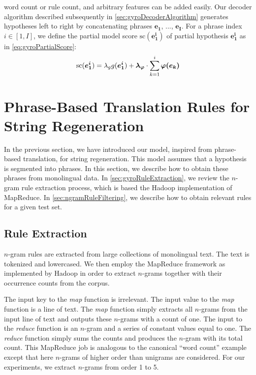 word count or rule count, and arbitrary features can be added easily.
Our decoder algorithm described subsequently in
\autoref{sec:gyroDecoderAlgorithm} generates hypotheses left to right
by concatenating phrases $\bm{e_1}$, ..., $\bm{e_I}$. For a phrase index $i \in [1, I]$,
we define the partial model score $\text{sc}(\bm{e_1^i})$ of partial hypothesis $\bm{e_1^i}$ as
in \autoref{eq:gyroPartialScore}:
%
\begin{equation}
  \text{sc}(\bm{e_1^i}) = \lambda_g g(\bm{e_1^i}) + \bm{\lambda_{\varphi}} \cdot \sum_{k = 1}^i \bm{\varphi(e_k)} \\
  \label{eq:gyroPartialScore}
\end{equation}

\section{Phrase-Based Translation Rules for String Regeneration}
\label{sec:gyroPhraseBasedRules}

In the previous section, we have introduced our model, inspired from
phrase-based translation, for string regeneration.
This model assumes that a hypothesis is segmented into phrases.
In this section, we describe how to obtain these phrases
from monolingual data. In \autoref{sec:gyroRuleExtraction}, we review
the $n$-gram rule extraction process, which is based the Hadoop implementation
of MapReduce. In \autoref{sec:ngramRuleFiltering}, we describe how to obtain
relevant rules for a given test set.

\subsection{Rule Extraction}
\label{sec:gyroRuleExtraction}

$n$-gram rules are extracted from large collections of monolingual
text. The text is tokenized and lowercased. We then
employ the MapReduce
framework as implemented by Hadoop in order to extract %
$n$-grams together with their occurrence counts from the corpus.

The input key to the \emph{map} function is irrelevant.
The input value to the \emph{map} function is a line of text.
The \emph{map} function simply extracts all $n$-grams from the
input line of text and outputs these $n$-grams with a count of
one. The input to the \emph{reduce} function is an $n$-gram
and a series of constant values equal to one.
The \emph{reduce} function simply sums the counts
and produces the $n$-gram with its total count. This MapReduce
job is analogous to the canonical ``word count'' example except
that here $n$-grams of higher order than unigrams are considered.
For our experiments, we extract $n$-grams from order 1 to 5. %

